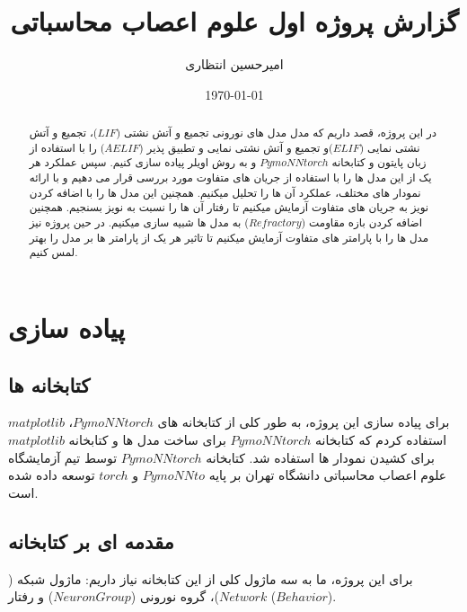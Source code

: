 \documentclass{article}
\title{گزارش پروژه اول علوم اعصاب محاسباتی}
\author{امیرحسین انتظاری}
\date{\today}
\begin{document}
\maketitle
\newpage

    \begin{abstract}
        در این پروژه، قصد داریم که مدل مدل های نورونی تجمیع و آتش نشتی
        ($LIF$)، 
        تجمیع و آتش نشتی نمایی
        ($ELIF$)و 
        تجمیع و آتش نشتی نمایی و تطبیق پذیر
        ($AELIF$) 
        را با استفاده از زبان پایتون و کتابخانه 
        $PymoNNtorch$ 
        و به روش اویلر پیاده سازی کنیم. سپس عملکرد هر یک از این مدل ها را با استفاده از جریان های متفاوت مورد بررسی قرار می دهیم و با ارائه نمودار های مختلف، عملکرد آن ها را تحلیل میکنیم. همچنین این مدل ها را با اضافه کردن نویز به جریان های متفاوت آزمایش میکنیم تا رفتار آن ها را نسبت به نویز بسنجیم. همچنین اضافه کردن بازه مقاومت
        ($Refractory$)
        به مدل ها شبیه سازی میکنیم. در حین پروژه نیز مدل ها را با پارامتر های متفاوت آزمایش میکنیم تا تاثیر هر یک از پارامتر ها بر مدل را بهتر لمس کنیم.
    \end{abstract}

\newpage
    \section{پیاده سازی}
    \subsection{کتابخانه ها}
        برای پیاده سازی این پروژه، به طور کلی از کتابخانه های
        $PymoNNtorch$، 
        $matplotlib$ 
        استفاده کردم که کتابخانه 
        $PymoNNtorch$ 
        برای ساخت مدل ها و کتابخانه 
        $matplotlib$ 
        برای کشیدن نمودار ها استفاده شد.
        کتابخانه
        $PymoNNtorch$ 
        توسط تیم آزمایشگاه علوم اعصاب محاسباتی دانشگاه تهران بر پایه 
        $PymoNNto$ و
        $torch$ 
        توسعه داده شده است.

    \subsection{مقدمه ای بر کتابخانه }
        برای این پروژه، ما به سه ماژول کلی از این کتابخانه نیاز داریم: ماژول شبکه
        ($Network$)، 
        گروه نورونی
        ($NeuronGroup$) و
        رفتار 
        ($Behavior$).
\end{document}
